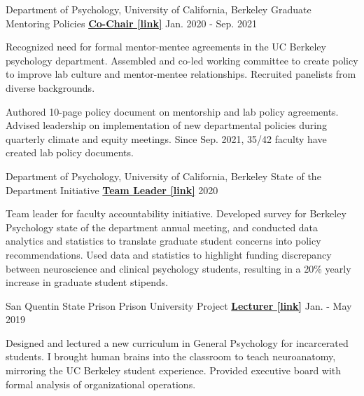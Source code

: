 \begin{cventries}

  \cventry 
    {Department of Psychology, University of California, Berkeley} %
    {Graduate Mentoring Policies}
    {\href{http://ivrylab.berkeley.edu/uploads/4/1/1/5/41152143/cognac_lab_policies_19feb2021.pdf}{\textbf{Co-Chair [link]}}} %
    {Jan. 2020 - Sep. 2021} %
    {
      \begin{cvitems} %
        \item {Recognized need for formal mentor-mentee agreements in the UC Berkeley psychology department. Assembled and co-led working committee to create policy to improve lab culture and mentor-mentee relationships. Recruited panelists from diverse backgrounds.}
        \item {Authored 10-page policy document on mentorship and lab policy agreements. Advised leadership on implementation of new departmental policies during quarterly climate and equity meetings. Since Sep. 2021, 35/42 faculty have created lab policy documents.}
      \end{cvitems}
    }

  \cventry 
    {Department of Psychology, University of California, Berkeley} %
    {State of the Department Initiative}
    {\href{https://drive.google.com/file/d/1wD7y5gW39EU4vQUyhcrO7Fra1Ttc_HyG/view?usp=sharing}{\textbf{Team Leader [link]}}} %
    {2020} %
   	{
      \begin{cvitems} %
      	\item {Team leader for faculty accountability initiative. Developed survey for Berkeley Psychology state of the department annual meeting, and conducted data analytics and statistics to translate graduate student concerns into policy recommendations. Used data and statistics to highlight funding discrepancy between neuroscience and clinical psychology students, resulting in a 20\% yearly increase in graduate student stipends.}
     \end{cvitems}
    }
    
  \cventry
    {San Quentin State Prison} %
    {Prison University Project}
    {\href{https://www.neh.gov/about/awards/national-humanities-medals/prison-university-project}{\textbf{Lecturer [link]}}} %
    {Jan. - May 2019} %
    {
      \begin{cvitems} %
        \item {Designed and lectured a new curriculum in General Psychology for incarcerated students. I brought human brains into the classroom to teach neuroanatomy, mirroring the UC Berkeley student experience. Provided executive board with formal analysis of organizational operations.}
      \end{cvitems}
    }
    

\end{cventries}
